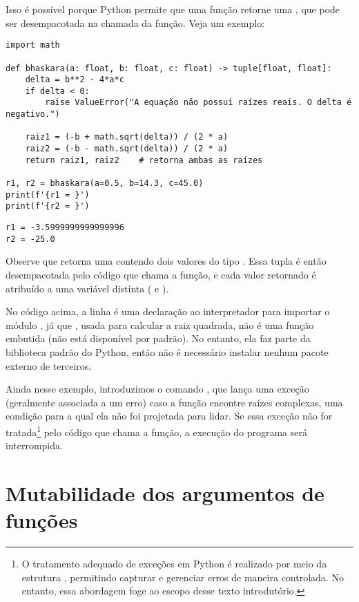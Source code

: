 Isso é possível porque Python permite que uma função retorne uma , que pode ser desempacotada na chamada
da função.
Veja um exemplo:
\begin{verbatim}
import math

def bhaskara(a: float, b: float, c: float) -> tuple[float, float]:
    delta = b**2 - 4*a*c
    if delta < 0:
        raise ValueError("A equação não possui raízes reais. O delta é negativo.")

    raiz1 = (-b + math.sqrt(delta)) / (2 * a)
    raiz2 = (-b - math.sqrt(delta)) / (2 * a)
    return raiz1, raiz2    # retorna ambas as raízes

r1, r2 = bhaskara(a=0.5, b=14.3, c=45.0)
print(f'{r1 = }')
print(f'{r2 = }')
\end{verbatim}
\begin{verbatim}
r1 = -3.5999999999999996
r2 = -25.0
\end{verbatim}

Observe que  retorna uma  contendo dois valores do tipo .
Essa tupla é então desempacotada pelo código que chama a função, e cada valor retornado é atribuído a uma
variável distinta ( e ).

No código acima, a linha  é uma declaração ao interpretador para importar o módulo ,
já que , usada para calcular a raiz quadrada, não é uma função embutida (não está disponível por padrão).
No entanto, ela faz parte da biblioteca padrão do Python, então não é necessário instalar nenhum pacote externo de terceiros.

Ainda nesse exemplo, introduzimos o comando , que lança uma exceção (geralmente associada a um erro)
caso a função encontre raízes complexas, uma condição para a qual ela não foi projetada para lidar.
Se essa exceção não for tratada\footnote{O tratamento adequado de exceções em Python é realizado por meio da estrutura , permitindo capturar
e gerenciar erros de maneira controlada.
No entanto, essa abordagem foge ao escopo desse texto introdutório.} pelo código que chama a função, a execução do programa será interrompida.



\section{Mutabilidade dos argumentos de funções}


